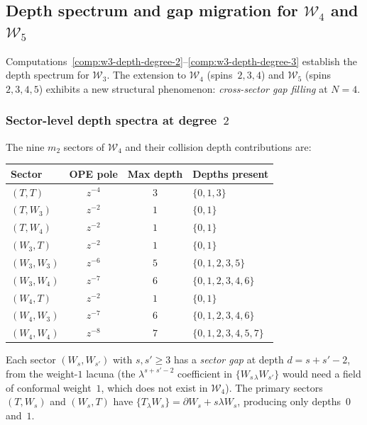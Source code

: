
\subsection{Depth spectrum and gap migration for
\texorpdfstring{$\mathcal{W}_4$}{W\_4} and
\texorpdfstring{$\mathcal{W}_5$}{W\_5}}
\label{subsec:w4-w5-depth-spectrum}

Computations~\ref{comp:w3-depth-degree-2}--\ref{comp:w3-depth-degree-3}
establish the depth spectrum for $\mathcal{W}_3$.
The extension to $\mathcal{W}_4$ (spins~$2,3,4$)
and $\mathcal{W}_5$ (spins~$2,3,4,5$) exhibits a new
structural phenomenon: \emph{cross-sector gap filling} at
$N = 4$.

\subsubsection{Sector-level depth spectra at degree~$2$}
\label{subsubsec:w4-w5-depth-degree-2}

\begin{computation}
\label{comp:w4-depth-degree-2}
%
The nine $m_2$ sectors of $\mathcal{W}_4$ and their collision
depth contributions are:
\begin{center}
\small
\renewcommand{\arraystretch}{1.3}
\begin{tabular}{lccl}
\toprule
\textbf{Sector} & \textbf{OPE pole}
 & \textbf{Max depth} & \textbf{Depths present} \\
\midrule
$(T,T)$ & $z^{-4}$ & $3$ & $\{0, 1, 3\}$ \\
$(T,W_3)$ & $z^{-2}$ & $1$ & $\{0, 1\}$ \\
$(T,W_4)$ & $z^{-2}$ & $1$ & $\{0, 1\}$ \\
$(W_3,T)$ & $z^{-2}$ & $1$ & $\{0, 1\}$ \\
$(W_3,W_3)$ & $z^{-6}$ & $5$ & $\{0, 1, 2, 3, 5\}$ \\
$(W_3,W_4)$ & $z^{-7}$ & $6$ & $\{0, 1, 2, 3, 4, 6\}$ \\
$(W_4,T)$ & $z^{-2}$ & $1$ & $\{0, 1\}$ \\
$(W_4,W_3)$ & $z^{-7}$ & $6$ & $\{0, 1, 2, 3, 4, 6\}$ \\
$(W_4,W_4)$ & $z^{-8}$ & $7$ & $\{0, 1, 2, 3, 4, 5, 7\}$ \\
\bottomrule
\end{tabular}
\end{center}

\noindent
Each sector $(W_s, W_{s'})$ with $s, s' \ge 3$ has a
\emph{sector gap} at depth $d = s + s' - 2$, from the
weight-$1$ lacuna (the $\lambda^{s+s'-2}$ coefficient in
$\{W_{s\,\lambda} W_{s'}\}$ would need a field of conformal
weight~$1$, which does not exist in $\mathcal{W}_4$).
The primary sectors $(T, W_s)$ and $(W_s, T)$ have
$\{T_\lambda W_s\} = \partial W_s + s\lambda W_s$,
producing only depths~$0$ and~$1$.
\end{computation}

